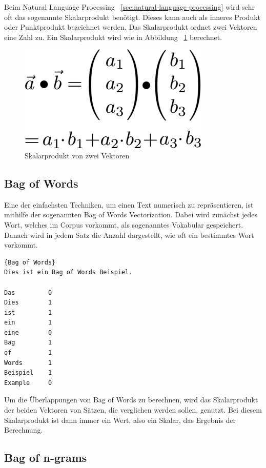 Beim Natural Language Processing ~\ref{sec:natural-language-processing} wird sehr oft das sogenannte Skalarprodukt benötigt.
Dieses kann auch als inneres Produkt oder Punktprodukt bezeichnet werden.
Das Skalarprodukt ordnet zwei Vektoren eine Zahl zu.
Ein Skalarprodukt wird wie in Abbildung ~\ref{fig:dot-product} berechnet.

\begin{figure}[hbt!]
    \centering
    \includegraphics[scale=0.5]{pics/dot-product}
    \caption{Skalarprodukt von zwei Vektoren~\cite{dotProduct}}
    \label{fig:dot-product}
\end{figure}

\subsection{Bag of Words}\label{subsec:bag-of-words}

Eine der einfachsten Techniken, um einen Text numerisch zu repräsentieren, ist mithilfe der sogenannten Bag of Words Vectorization.
Dabei wird zunächst jedes Wort, welches im Corpus vorkommt, als sogenanntes Vokabular gespeichert.
Danach wird in jedem Satz die Anzahl dargestellt, wie oft ein bestimmtes Wort vorkommt.\cite{textAnalysisMonkeylearn}

\begin{lstlisting}[label={lst:bag-of-word},caption={Bag of Words}]{Bag of Words}
Dies ist ein Bag of Words Beispiel.

Das         0
Dies        1
ist         1
ein         1
eine        0
Bag         1
of          1
Words       1
Beispiel    1
Example     0
\end{lstlisting}

Um die Überlappungen von Bag of Words zu berechnen, wird das Skalarprodukt der beiden Vektoren von Sätzen, die verglichen werden sollen, genutzt.
Bei diesem Skalarprodukt ist dann immer ein Wert, also ein Skalar, das Ergebnis der Berechnung.


\subsection{Bag of n-grams}\label{subsec:bag-of-ngrams}

